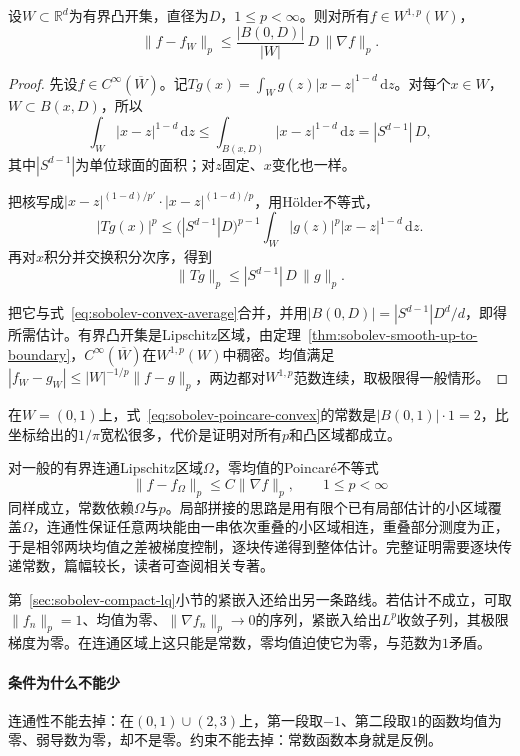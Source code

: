 \begin{theorem}[凸区域上的零均值Poincaré不等式]
\label{thm:sobolev-poincare-convex}
设$W\subset\mathbb R^d$为有界凸开集，直径为$D$，$1\leq p<\infty$。则对所有$f\in W^{1,p}(W)$，
\begin{equation}
\lVert f-f_W\rVert_p\leq\frac{|B(0,D)|}{|W|}\,D\,\lVert\nabla f\rVert_p .
\label{eq:sobolev-poincare-convex}
\end{equation}
\end{theorem}

\begin{proof}
先设$f\in C^\infty(\overline W)$。记$Tg(x)=\int_Wg(z)|x-z|^{1-d}\,\mathrm dz$。对每个$x\in W$，$W\subset B(x,D)$，所以
\[
\int_W|x-z|^{1-d}\,\mathrm dz\leq\int_{B(x,D)}|x-z|^{1-d}\,\mathrm dz=|S^{d-1}|\,D,
\]
其中$|S^{d-1}|$为单位球面的面积；对$z$固定、$x$变化也一样。

把核写成$|x-z|^{(1-d)/p'}\cdot|x-z|^{(1-d)/p}$，用Hölder不等式，
\[
|Tg(x)|^p\leq\bigl(|S^{d-1}|D\bigr)^{p-1}\int_W|g(z)|^p|x-z|^{1-d}\,\mathrm dz .
\]
再对$x$积分并交换积分次序，得到
\[
\lVert Tg\rVert_p\leq|S^{d-1}|\,D\,\lVert g\rVert_p .
\]

把它与式~\eqref{eq:sobolev-convex-average}合并，并用$|B(0,D)|=|S^{d-1}|D^d/d$，即得所需估计。有界凸开集是Lipschitz区域，由定理~\ref{thm:sobolev-smooth-up-to-boundary}，$C^\infty(\overline W)$在$W^{1,p}(W)$中稠密。均值满足$|f_W-g_W|\leq|W|^{-1/p}\lVert f-g\rVert_p$，两边都对$W^{1,p}$范数连续，取极限得一般情形。
\end{proof}

在$W=(0,1)$上，式~\eqref{eq:sobolev-poincare-convex}的常数是$|B(0,1)|\cdot1=2$，比坐标给出的$1/\pi$宽松很多，代价是证明对所有$p$和凸区域都成立。

对一般的有界连通Lipschitz区域$\Omega$，零均值的Poincaré不等式
\[
\lVert f-f_\Omega\rVert_p\leq C\lVert\nabla f\rVert_p,\qquad1\leq p<\infty
\]
同样成立，常数依赖$\Omega$与$p$。局部拼接的思路是用有限个已有局部估计的小区域覆盖$\Omega$，连通性保证任意两块能由一串依次重叠的小区域相连，重叠部分测度为正，于是相邻两块均值之差被梯度控制，逐块传递得到整体估计。完整证明需要逐块传递常数，篇幅较长，读者可查阅相关专著。

第~\ref{sec:sobolev-compact-lq}小节的紧嵌入还给出另一条路线。若估计不成立，可取$\lVert f_n\rVert_p=1$、均值为零、$\lVert\nabla f_n\rVert_p\to0$的序列，紧嵌入给出$L^p$收敛子列，其极限梯度为零。在连通区域上这只能是常数，零均值迫使它为零，与范数为$1$矛盾。

\paragraph{条件为什么不能少}
连通性不能去掉：在$(0,1)\cup(2,3)$上，第一段取$-1$、第二段取$1$的函数均值为零、弱导数为零，却不是零。约束不能去掉：常数函数本身就是反例。

